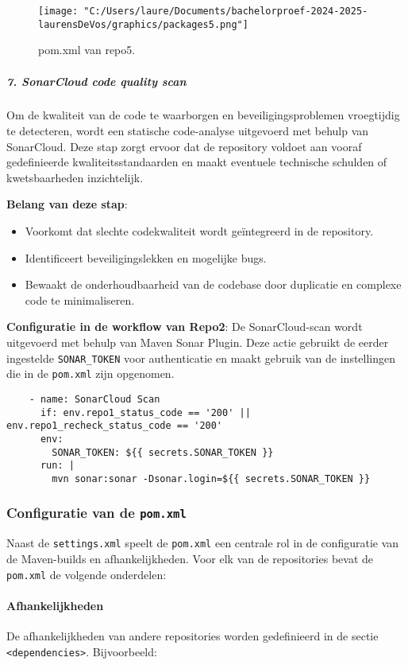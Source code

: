 \begin{figure}[h!]
    \centering
    \texttt{[image: "C:/Users/laure/Documents/bachelorproef-2024-2025-laurensDeVos/graphics/packages5.png"]}
    \caption{pom.xml van repo5.}
    \label{fig:packages5}
\end{figure}

\subparagraph{7. SonarCloud code quality scan}
Om de kwaliteit van de code te waarborgen en beveiligingsproblemen vroegtijdig te detecteren, wordt een statische code-analyse uitgevoerd met behulp van SonarCloud. Deze stap zorgt ervoor dat de repository voldoet aan vooraf gedefinieerde kwaliteitsstandaarden en maakt eventuele technische schulden of kwetsbaarheden inzichtelijk.

\textbf{Belang van deze stap}:
\begin{itemize}
    \item Voorkomt dat slechte codekwaliteit wordt geïntegreerd in de repository.
    \item Identificeert beveiligingslekken en mogelijke bugs.
    \item Bewaakt de onderhoudbaarheid van de codebase door duplicatie en complexe code te minimaliseren.
\end{itemize}

\textbf{Configuratie in de workflow van Repo2}:
De SonarCloud-scan wordt uitgevoerd met behulp van Maven Sonar Plugin. Deze actie gebruikt de eerder ingestelde \texttt{SONAR\_TOKEN} voor authenticatie en maakt gebruik van de instellingen die in de \texttt{pom.xml} zijn opgenomen.

\begin{verbatim}
    - name: SonarCloud Scan
      if: env.repo1_status_code == '200' || env.repo1_recheck_status_code == '200'
      env:
        SONAR_TOKEN: ${{ secrets.SONAR_TOKEN }}
      run: |
        mvn sonar:sonar -Dsonar.login=${{ secrets.SONAR_TOKEN }}
\end{verbatim}

\subsubsection{Configuratie van de \texttt{pom.xml}}
Naast de \texttt{settings.xml} speelt de \texttt{pom.xml} een centrale rol in de configuratie van de Maven-builds en afhankelijkheden. Voor elk van de repositories bevat de \texttt{pom.xml} de volgende onderdelen:

\paragraph{Afhankelijkheden}
De afhankelijkheden van andere repositories worden gedefinieerd in de sectie \texttt{<dependencies>}. Bijvoorbeeld:

